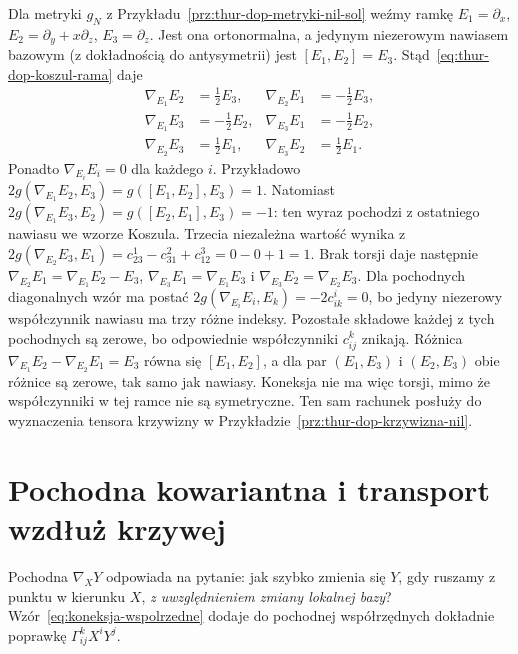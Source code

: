 \begin{przyklad}
\label{prz:thur-dop-koneksja-nil}
Dla metryki $g_N$ z Przykładu~\ref{prz:thur-dop-metryki-nil-sol}
weźmy ramkę
$E_1=\partial_x$, $E_2=\partial_y+x\partial_z$,
$E_3=\partial_z$. Jest ona ortonormalna, a jedynym
niezerowym nawiasem bazowym (z dokładnością do antysymetrii)
jest $[E_1,E_2]=E_3$. Stąd~\eqref{eq:thur-dop-koszul-rama}
daje
\[
\begin{aligned}
 \nabla_{E_1}E_2&=\tfrac12E_3,&
 \nabla_{E_2}E_1&=-\tfrac12E_3,\\
 \nabla_{E_1}E_3&=-\tfrac12E_2,&
 \nabla_{E_3}E_1&=-\tfrac12E_2,\\
 \nabla_{E_2}E_3&=\tfrac12E_1,&
 \nabla_{E_3}E_2&=\tfrac12E_1.
\end{aligned}
\]
Ponadto $\nabla_{E_i}E_i=0$ dla każdego $i$.
Przykładowo $2g(\nabla_{E_1}E_2,E_3)
=g([E_1,E_2],E_3)=1$.
Natomiast $2g(\nabla_{E_1}E_3,E_2)
=g([E_2,E_1],E_3)=-1$: ten wyraz pochodzi
z ostatniego nawiasu we wzorze Koszula.
Trzecia niezależna wartość wynika z
$2g(\nabla_{E_2}E_3,E_1)
=c_{23}^1-c_{31}^2+c_{12}^3=0-0+1=1$.
Brak torsji daje następnie
$\nabla_{E_2}E_1=\nabla_{E_1}E_2-E_3$,
$\nabla_{E_3}E_1=\nabla_{E_1}E_3$
i $\nabla_{E_3}E_2=\nabla_{E_2}E_3$.
Dla pochodnych diagonalnych wzór ma postać
$2g(\nabla_{E_i}E_i,E_k)=-2c_{ik}^i=0$,
bo jedyny niezerowy współczynnik nawiasu ma trzy różne indeksy.
Pozostałe składowe każdej z tych pochodnych są zerowe,
bo odpowiednie współczynniki $c_{ij}^k$ znikają.
Różnica $\nabla_{E_1}E_2-\nabla_{E_2}E_1=E_3$
równa się $[E_1,E_2]$, a dla par $(E_1,E_3)$ i $(E_2,E_3)$
obie różnice są zerowe, tak samo jak nawiasy.
Koneksja nie ma więc torsji,
mimo że współczynniki w tej ramce nie są symetryczne.
Ten sam rachunek posłuży do wyznaczenia tensora krzywizny
w Przykładzie~\ref{prz:thur-dop-krzywizna-nil}.
\end{przyklad}

\section{Pochodna kowariantna i transport wzdłuż krzywej}
\label{sec:transport-rownolegly}

Pochodna $\nabla_XY$ odpowiada na pytanie:
jak szybko zmienia się $Y$, gdy ruszamy z punktu
w kierunku $X$, \emph{z uwzględnieniem zmiany lokalnej bazy}?
Wzór~\eqref{eq:koneksja-wspolrzedne} dodaje do
pochodnej współrzędnych dokładnie poprawkę
$\Gamma^k_{ij}X^iY^j$.


